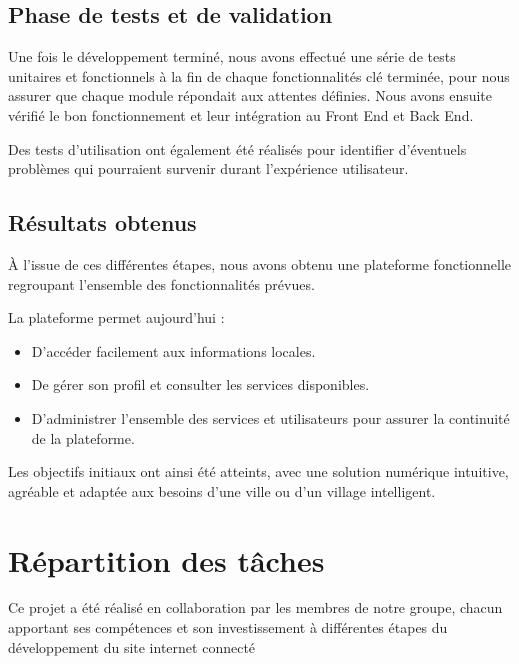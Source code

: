 \documentclass[a4paper,12pt]{report}
\begin{document}
	\subsection{Phase de tests et de validation}
	Une fois le développement terminé, nous avons effectué une série de tests unitaires et fonctionnels à la fin de chaque fonctionnalités clé terminée, pour nous assurer que chaque module répondait aux attentes définies. Nous avons ensuite vérifié le bon fonctionnement et leur intégration au Front End et Back End.
	
	Des tests d'utilisation ont également été réalisés pour identifier d'éventuels problèmes qui pourraient survenir durant l'expérience utilisateur.
	
	\subsection{Résultats obtenus}
	À l'issue de ces différentes étapes, nous avons obtenu une plateforme fonctionnelle regroupant l'ensemble des fonctionnalités prévues.
	
	La plateforme permet aujourd'hui :
	\begin{itemize}
		\item D'accéder facilement aux informations locales.
		\item De gérer son profil et consulter les services disponibles.
		\item D'administrer l'ensemble des services et utilisateurs pour assurer la continuité de la plateforme.
	\end{itemize}
	
	Les objectifs initiaux ont ainsi été atteints, avec une solution numérique intuitive, agréable et adaptée aux besoins d'une ville ou d'un village intelligent.
	

	\section*{Répartition des tâches}

Ce projet a été réalisé en collaboration par les membres de notre groupe, chacun apportant ses compétences et son investissement à différentes étapes du développement du site internet connecté
\end{document}
